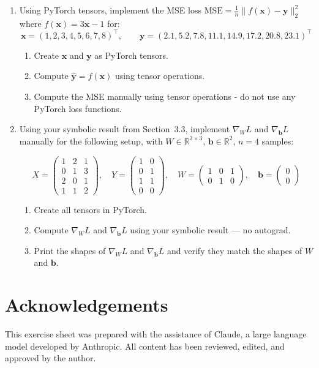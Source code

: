\documentclass[12pt, a4paper]{scrartcl}
\begin{document}
\begin{enumerate}

\item Using PyTorch tensors, implement the MSE loss $\mathrm{MSE} =
\frac{1}{n}\|f(\mathbf{x}) - \mathbf{y}\|_2^2$ where $f(\mathbf{x}) = 3\mathbf{x}
- 1$ for:
\[
\mathbf{x} = (1, 2, 3, 4, 5, 6, 7, 8)^\top, \qquad
\mathbf{y} = (2.1, 5.2, 7.8, 11.1, 14.9, 17.2, 20.8, 23.1)^\top
\]

\begin{enumerate}
    \item Create $\mathbf{x}$ and $\mathbf{y}$ as PyTorch tensors.
    \item Compute $\hat{\mathbf{y}} = f(\mathbf{x})$ using tensor operations.
    \item Compute the MSE manually using tensor operations - do not use any
    PyTorch loss functions.
\end{enumerate}

\item Using your symbolic result from Section~3.3, implement $\nabla_W L$ and
$\nabla_\mathbf{b} L$ manually for the following setup, with $W \in
\mathbb{R}^{2 \times 3}$, $\mathbf{b} \in \mathbb{R}^2$, $n = 4$ samples:

\[
X = \begin{pmatrix} 1 & 2 & 1 \\ 0 & 1 & 3 \\ 2 & 0 & 1 \\ 1 & 1 & 2
\end{pmatrix}, \quad
Y = \begin{pmatrix} 1 & 0 \\ 0 & 1 \\ 1 & 1 \\ 0 & 0 \end{pmatrix}, \quad
W = \begin{pmatrix} 1 & 0 & 1 \\ 0 & 1 & 0 \end{pmatrix}, \quad
\mathbf{b} = \begin{pmatrix} 0 \\ 0 \end{pmatrix}
\]

\begin{enumerate}
    \item Create all tensors in PyTorch.
    \item Compute $\nabla_W L$ and $\nabla_\mathbf{b} L$ using your symbolic
    result — no autograd.
    \item Print the shapes of $\nabla_W L$ and $\nabla_\mathbf{b} L$ and verify
    they match the shapes of $W$ and $\mathbf{b}$.
\end{enumerate}

\end{enumerate}

\section*{Acknowledgements}
This exercise sheet was prepared with the assistance of Claude, a large
language model developed by Anthropic. All content has been reviewed, edited,
and approved by the author.
\end{document}
